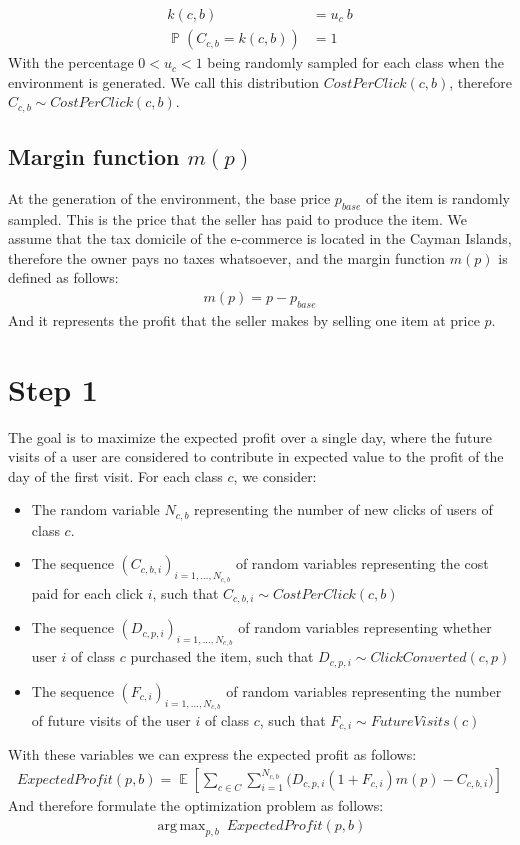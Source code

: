 \documentclass[11pt]{article} %
\DeclareMathOperator{\EX}{\mathbb{E}}
\DeclareMathOperator{\Prob}{\mathbb{P}}
\DeclareMathOperator*{\argmax}{arg\,max}
\begin{document}
\begin{align*}
k(c,b) &= u_c\  b\\
\Prob(C_{c,b} = k(c,b)) &= 1
\end{align*}
With the percentage $0 < u_c < 1$ being randomly sampled for each class when the environment is generated.
We call this distribution $CostPerClick(c,b)$, therefore $C_{c,b}\sim CostPerClick(c,b)$.

\subsection{Margin function $m(p)$}
At the generation of the environment, the base price $p_{base}$ of the item is randomly sampled. This is the price that the seller has paid to produce the item. We assume that the tax domicile of the e-commerce is located in the Cayman Islands, therefore the owner pays no taxes whatsoever, and the margin function $m(p)$ is defined as follows:
\begin{align*}
m(p)=p-p_{base}
\end{align*}
And it represents the profit that the seller makes by selling one item at price $p$.

\clearpage
\section{Step 1}
The goal is to maximize the expected profit over a single day, where the future visits of a user are considered to contribute in expected value to the profit of the day of the first visit.
\newline
\newline
For each class $c$, we consider:
\begin{itemize}
\item The random variable $N_{c,b}$ representing the number of new clicks of users of class $c$.
\item The sequence $(C_{c,b,i})_{i=1,...,N_{c,b}}$ of random variables representing the cost paid for each click $i$, such that $C_{c,b,i}\sim CostPerClick(c,b)$
\item The sequence $(D_{c,p,i})_{i=1,...,N_{c,b}}$ of random variables representing whether user $i$ of class $c$ purchased the item, such that $D_{c,p,i}\sim ClickConverted(c,p)$
\item The sequence $(F_{c,i})_{i=1,...,N_{c,b}}$ of random variables representing the number of future visits of the user $i$ of class $c$, such that $F_{c,i}\sim FutureVisits(c)$
\end{itemize}
With these variables we can express the expected profit as follows:
\begin{align*}
ExpectedProfit(p,b) = \EX\left[\sum_{c \in C}{\sum_{i =1}^{N_{c,b}}{\bigg( D_{c,p,i}(1+F_{c,i})m(p)-C_{c,b,i}\bigg)}}\right]
\end{align*}
And therefore formulate the optimization problem as follows:
\begin{align*}
\argmax_{p,b}{\ ExpectedProfit(p,b)}
\end{align*}
\end{document}
